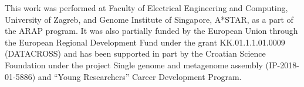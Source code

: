 \documentclass{article}
\begin{document}
\newpage

\begin{ack}
This work was performed at Faculty of Electrical Engineering and Computing, University of Zagreb, and Genome Institute of Singapore, A*STAR, as a part of the ARAP program. It was also partially funded by the European Union through the European Regional Development Fund under the grant KK.01.1.1.01.0009 (DATACROSS) and has been supported in part by the Croatian Science Foundation under the project Single genome and metagenome assembly (IP-2018-01-5886) and “Young Researchers” Career Development Program.

\end{ack}

% 
% 

\end{document}
